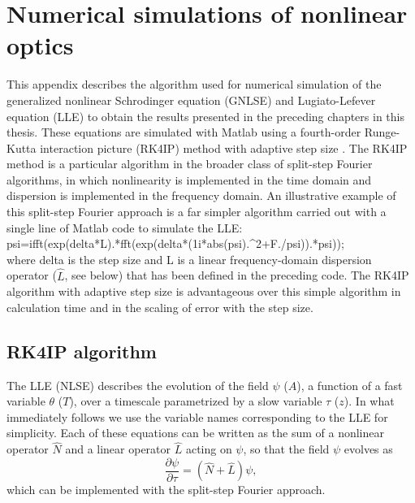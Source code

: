 \chapter{Numerical simulations of nonlinear optics}
 \label{app:numericalsims}



This appendix describes the algorithm used for numerical simulation of the generalized nonlinear Schrodinger equation (GNLSE) and Lugiato-Lefever equation (LLE) to obtain the results presented in the preceding chapters in this thesis. These equations are simulated with Matlab using a fourth-order Runge-Kutta interaction picture (RK4IP) method \cite{Hult2007} with adaptive step size \cite{Heidt2009}. The RK4IP method is a particular algorithm in the broader class of split-step Fourier algorithms, in which nonlinearity is implemented in the time domain and dispersion is implemented in the frequency domain. An illustrative example of this split-step Fourier approach is a far simpler algorithm carried out with a single line of Matlab code to simulate the LLE: \\
{\selectfont psi=ifft(exp(delta*L).*fft(exp(delta*(1i*abs(psi).\string^2+F./psi)).*psi));}\\
where {\selectfont delta} is the step size and  {\selectfont L} is a linear frequency-domain dispersion operator ($\hat{L}$, see below) that has been defined in the preceding code. The RK4IP algorithm with adaptive step size is advantageous over this simple algorithm in calculation time and in the scaling of error with the step size.

\section{RK4IP algorithm}

The LLE (NLSE) describes the evolution of the field $\psi$ ($A$), a function of a fast variable $\theta$ ($T$), over a timescale parametrized by a slow variable $\tau$ ($z$). In what immediately follows we use the variable names corresponding to the LLE for simplicity. Each of these equations can be written as the sum of a nonlinear operator $\hat{N}$ and a linear operator $\hat{L}$ acting on $\psi$, so that the field $\psi$ evolves as
\begin{equation}
\frac{\partial\psi}{\partial\tau}=(\hat{N}+\hat{L})\psi,
\end{equation}
which can be implemented with the split-step Fourier approach.


